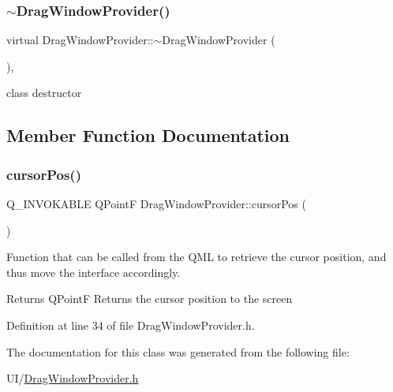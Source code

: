 \subsubsection{\texorpdfstring{$\sim$\+Drag\+Window\+Provider()}{~DragWindowProvider()}}
{\footnotesize\ttfamily virtual Drag\+Window\+Provider\+::$\sim$\+Drag\+Window\+Provider (\begin{DoxyParamCaption}{ }\end{DoxyParamCaption})\hspace{0.3cm}{\ttfamily [virtual]}, {\ttfamily [default]}}



class destructor 



\subsection{Member Function Documentation}
\mbox{\label{class_drag_window_provider_ab55b2847cd09565bd080e16e144f7d24}} 
\subsubsection{\texorpdfstring{cursor\+Pos()}{cursorPos()}}
{\footnotesize\ttfamily Q\+\_\+\+I\+N\+V\+O\+K\+A\+B\+LE Q\+PointF Drag\+Window\+Provider\+::cursor\+Pos (\begin{DoxyParamCaption}{ }\end{DoxyParamCaption})\hspace{0.3cm}{\ttfamily [inline]}}



Function that can be called from the Q\+ML to retrieve the cursor position, and thus move the interface accordingly. 

\begin{DoxyReturn}{Returns}
Q\+PointF Returns the cursor position to the screen 
\end{DoxyReturn}


Definition at line 34 of file Drag\+Window\+Provider.\+h.



The documentation for this class was generated from the following file\+:\begin{DoxyCompactItemize}
\item 
U\+I/\hyperlink{_drag_window_provider_8h}{Drag\+Window\+Provider.\+h}\end{DoxyCompactItemize}
